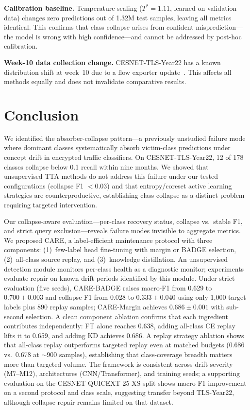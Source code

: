 \documentclass[journal]{IEEEtran}
\newcommand{\ours}{CARE}  %
\begin{document}
\textbf{Calibration baseline.}
Temperature scaling ($T^*{=}1.11$, learned on validation data) changes zero predictions out of 1.32M test samples, leaving all metrics identical.
This confirms that class collapse arises from confident misprediction---the model is wrong with high confidence---and cannot be addressed by post-hoc calibration.

\textbf{Week-10 data collection change.}
CESNET-TLS-Year22 has a known distribution shift at week~10 due to a flow exporter update~\cite{hynek2024cesnet}.
This affects all methods equally and does not invalidate comparative results.


\section{Conclusion}
\label{sec:conclusion}

We identified the absorber-collapse pattern---a previously unstudied failure mode where dominant classes systematically absorb victim-class predictions under concept drift in encrypted traffic classifiers.
On CESNET-TLS-Year22, 12 of 178 classes collapse below 0.1 recall within nine months.
We showed that unsupervised TTA methods do not address this failure under our tested configurations (collapse F1 ${<}0.03$) and that entropy/coreset active learning strategies are counterproductive, establishing class collapse as a distinct problem requiring targeted intervention.

Our collapse-aware evaluation---per-class recovery status, collapse vs.\ stable F1, and strict query exclusion---reveals failure modes invisible to aggregate metrics.
We proposed \ours{}, a label-efficient maintenance protocol with three components: (1)~few-label head fine-tuning with margin or BADGE selection, (2)~all-class source replay, and (3)~knowledge distillation.
An unsupervised detection module monitors per-class health as a diagnostic monitor; experiments evaluate repair on known drift periods identified by this module.
Under strict evaluation (five seeds), \ours{}-BADGE raises macro-F1 from 0.629 to $0.700{\pm}0.003$ and collapse F1 from 0.028 to $0.333{\pm}0.040$ using only 1{,}000 target labels plus 890 replay samples; \ours{}-Margin achieves $0.686{\pm}0.001$ with sub-second selection.
A clean component ablation confirms that each ingredient contributes independently: FT alone reaches 0.638, adding all-class CE replay lifts it to 0.659, and adding KD achieves 0.686.
A replay strategy ablation shows that all-class replay outperforms targeted replay even at matched budgets (0.686 vs.\ 0.678 at ${\sim}$900 samples), establishing that class-coverage breadth matters more than targeted volume.
The framework is consistent across drift severity (M7--M12), architectures (CNN/Transformer), and training seeds; a supporting evaluation on the CESNET-QUICEXT-25 XS split shows macro-F1 improvement on a second protocol and class scale, suggesting transfer beyond TLS-Year22, although collapse repair remains limited on that dataset.



\end{document}
